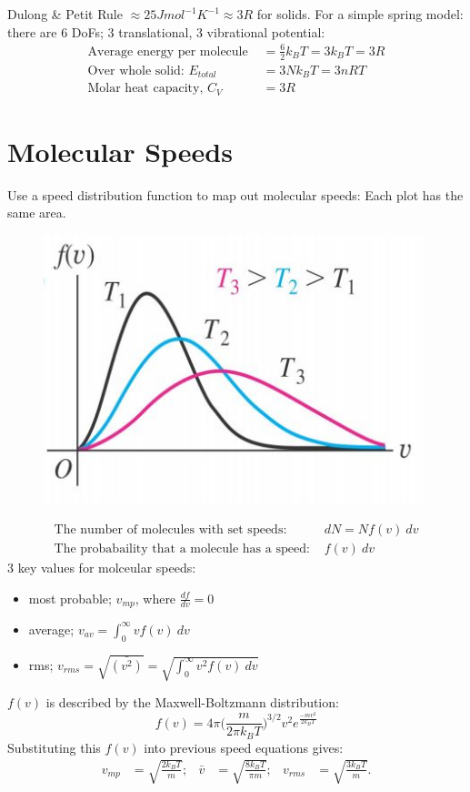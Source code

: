 \documentclass[a4paper, 11pt, normalem]{report}
\begin{document}
Dulong \& Petit Rule $\approx 25 J mol^{-1} K^{-1} \approx 3R$ for solids.
For a simple spring model: there are 6 DoFs; 3 translational, 3 vibrational potential:
\begin{align}
    \text{Average energy per molecule } &= \frac{6}{2}k_{B}T = 3k_{B}T = 3R \\
    \text{Over whole solid: } E_{total} &= 3Nk_{B}T = 3nRT\\
    \text{Molar heat capacity, } C_{V} &= 3R
\end{align}

\section{Molecular Speeds}
Use a speed distribution function to map out molecular speeds:
Each plot has the same area.
\begin{figure}[H]
    \centering
    \includegraphics[scale=0.85]{Distribution.jpg}
\end{figure}
\begin{align}
    \text{The number of molecules with set speeds: }& dN = Nf(v)~dv \\
    \text{The probabaility that a molecule has a speed: }& f(v)~dv
\end{align}
3 key values for molceular speeds:
\begin{itemize}
	\item most probable; $v_{mp}$, where $\frac{df}{dv} = 0$
	\item average; $v_{av} = \int_{0}^{\infty} vf(v)~dv$
	\item rms; $v_{rms} = \sqrt{\bar{(v^{2})}} = \sqrt{\int_{0}^{\infty} v^{2}f(v)~dv}$
\end{itemize}
$f(v)$ is described by the Maxwell-Boltzmann distribution:
\begin{equation}
	f(v) = 4{\pi}\bigg(\frac{m}{2{\pi}k_{B}T}\bigg)^{3/2}v^{2}e^{\frac{-mv^{2}}{2k_{B}T}}
\end{equation}
Substituting this $f(v)$ into previous speed equations gives:
\begin{align}
    v_{mp} &= \sqrt{\frac{2k_{B}T}{m}}; & \bar{v} &= \sqrt{\frac{8k_{B}T}{{\pi}m}}; & v_{rms} &= \sqrt{\frac{3k_{B}T}{m}}.
\end{align}
\end{document}
